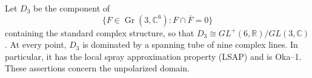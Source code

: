 \begin{theorem}\label{maps:src:F.3.8}


Let $D_3$ be the component of
\[
 \{F\in\operatorname{Gr}(3,\mathbb C^6):F\cap\overline F=0\}
\]
containing the standard complex structure, so that
$D_3\cong GL^+(6,\mathbb R)/GL(3,\mathbb C)$.
At every point, $D_3$
is dominated by a spanning tube of nine complex lines.  In particular,
it has the local spray approximation property (LSAP) and is Oka--1.
These assertions concern the unpolarized domain.

\end{theorem}



